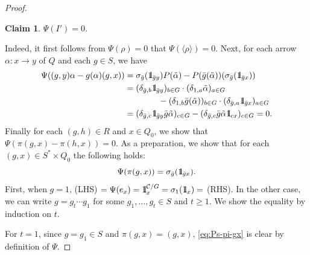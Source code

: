 \documentclass{surv-l}
\numberwithin{equation}{chapter}
\numberwithin{figure}{chapter}
\theoremstyle{plain}
\newtheorem{clm}{Claim}
\theoremstyle{definition}
\theoremstyle{remark}
\newcommand{\id}{1\kern-.25em{\text{{\rm l}}}}
\begin{document}
\begin{proof}
\begin{clm}
$\Psi(I')=0$.
\end{clm}
Indeed, it first follows from $\Psi(\rho)=0$ that $\Psi({\langle\rho \rangle})=0$.
Next, for each arrow $\alpha \colon x \to y$ of $Q$ and each $g\in S$,
we have
\begin{equation*}
\begin{aligned}
\Psi((g,y)\alpha - g(\alpha)(g,x))
&= \sigma_{\bar{g}}(\id_{\bar{g}y})P(\tilde{\alpha})
- P(\bar{g}(\tilde{\alpha}))(\sigma_{\bar{g}}(\id_{\bar{g}x}))\\
&= (\delta_{\bar{g},b}\id_{\bar{g}y})_{b\in G} \cdot
(\delta_{1,a} \tilde{\alpha})_{a\in G}\\
&\qquad\qquad  - (\delta_{1,b} \bar{g}(\tilde{\alpha}))_{b \in G}\cdot
(\delta_{\bar{g},a}\id_{\bar{g}x})_{a \in G}\\
&= (\delta_{\bar{g},c} \id_{\bar{g}y}\bar{g}\tilde{\alpha})_{c\in G}
- (\delta_{\bar{g},c}\bar{g}\tilde{\alpha}\id_{cx})_{c \in G}
= 0.
\end{aligned}
\end{equation*}
Finally for each $(g,h) \in R$ and $x \in Q_0$, we show that
$\Psi(\pi(g,x)-\pi(h,x))=0$.
As a preparation, we show that for each $(g, x) \in S^* \times Q_0$
the following holds:
\begin{equation}\label{eq:Ps-pi-gx}
\Psi(\pi(g,x)) = \sigma_{\bar{g}}(\id_{\bar{g}x}).
\end{equation}
First, when $g = 1$, (LHS) $= \Psi(e_x) = \id^{{\mathcal{C}}/G}_x = \sigma_1(\id_{x}) =$ (RHS).
In the other case, we can write
$g = g_t\cdots g_1$ for some $g_1, \dots, g_t \in S$ and $t \ge 1$.
We show the equality by induction on $t$.

For $t\!=\!1$, since $g\! = \!g_1\! \in\! S$ and $\pi(g,x)\! = \!(g, x)$,
\eqref{eq:Ps-pi-gx} is clear by definition of $\Psi$.


\end{proof}
\end{document}
